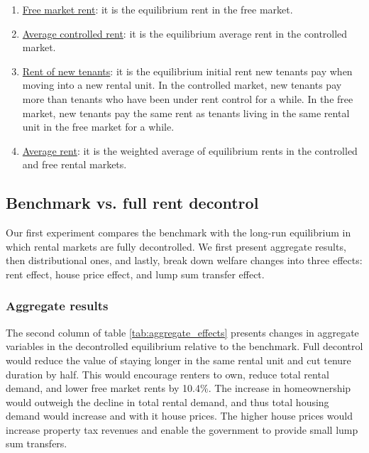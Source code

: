 \documentclass[parskip=full]{article}
\begin{document}
\begin{enumerate}
    \item \underline{Free market rent}: it is the equilibrium rent in the free market.
    \item \underline{Average controlled rent}: it is the equilibrium average rent in the controlled market.
    \item \underline{Rent of new tenants}: it is the equilibrium initial rent new tenants pay when moving into a new rental unit. In the controlled market, new tenants pay more than tenants who have been under rent control for a while. In the free market, new tenants pay the same rent as tenants living in the same rental unit in the free market for a while.
    \item \underline{Average rent}: it is the weighted average of equilibrium rents in the controlled and free rental markets.
\end{enumerate}

\subsection{Benchmark vs. full rent decontrol}\label{subsection:full_decontrol}
Our first experiment compares the benchmark with the long-run equilibrium in which rental markets are fully decontrolled. We first present aggregate results, then distributional ones, and lastly, break down welfare changes into three effects: rent effect, house price effect, and lump sum transfer effect.

\subsubsection{Aggregate results} The second column of table \ref{tab:aggregate_effects} presents changes in aggregate variables in the decontrolled equilibrium relative to the benchmark. Full decontrol would reduce the value of staying longer in the same rental unit and cut tenure duration by half. This would encourage renters to own, reduce total rental demand, and lower free market rents by 10.4\%. The increase in homeownership would outweigh the decline in total rental demand, and thus total housing demand would increase and with it house prices. The higher house prices would increase property tax revenues and enable the government to provide small lump sum transfers.
\end{document}
